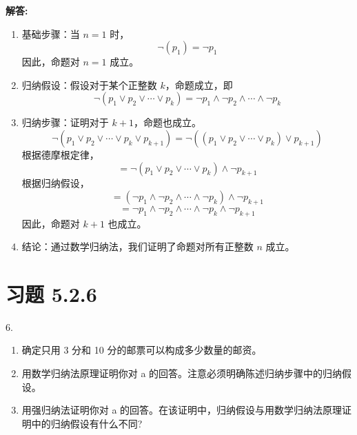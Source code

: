 \documentclass[UTF8]{report}
\theoremstyle{MyLineTheoremStyle} %
\theoremstyle{MyBlockTheoremStyle} %
\theoremstyle{MySubsubsectionStyle} %
\begin{document}
\textbf{解答:}
\begin{enumerate}
    \item 基础步骤：当 $n=1$ 时，
    \[
    \neg(p_1) = \neg p_1
    \]
    因此，命题对 $n=1$ 成立。
    \item 归纳假设：假设对于某个正整数 $k$，命题成立，即
    \[
    \neg(p_1 \vee p_2 \vee \cdots \vee p_k) = \neg p_1 \wedge \neg p_2 \wedge \cdots \wedge \neg p_k
    \]
    \item 归纳步骤：证明对于 $k+1$，命题也成立。
    \[
    \neg(p_1 \vee p_2 \vee \cdots \vee p_k \vee p_{k+1}) = \neg((p_1 \vee p_2 \vee \cdots \vee p_k) \vee p_{k+1})
    \]
    根据德摩根定律，
    \[
    = \neg(p_1 \vee p_2 \vee \cdots \vee p_k) \wedge \neg p_{k+1}
    \]
    根据归纳假设，
    \[
    = (\neg p_1 \wedge \neg p_2 \wedge \cdots \wedge \neg p_k) \wedge \neg p_{k+1}
    \]
    \[
    = \neg p_1 \wedge \neg p_2 \wedge \cdots \wedge \neg p_k \wedge \neg p_{k+1}
    \]
    因此，命题对 $k+1$ 也成立。
    \item 结论：通过数学归纳法，我们证明了命题对所有正整数 $n$ 成立。
\end{enumerate}


\section{习题 5.2.6}
6.
\begin{enumerate}
    \item 确定只用 3 分和 10 分的邮票可以构成多少数量的邮资。
    \item 用数学归纳法原理证明你对 a 的回答。注意必须明确陈述归纳步骤中的归纳假设。
    \item 用强归纳法证明你对 a 的回答。在该证明中，归纳假设与用数学归纳法原理证明中的归纳假设有什么不同?
\end{enumerate}
\end{document}
